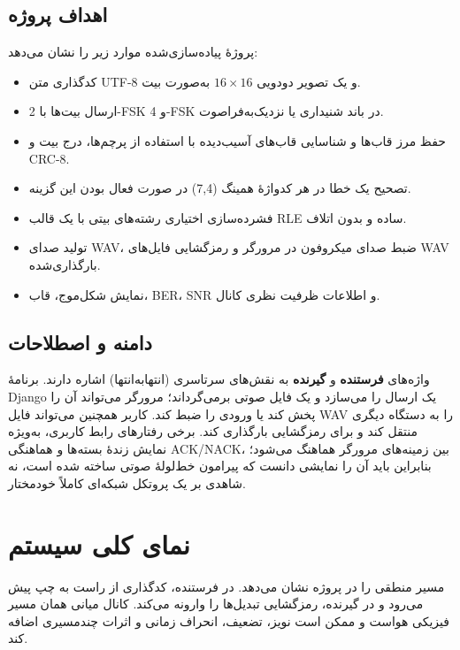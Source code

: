 \documentclass[12pt,a4paper]{article}
\providecommand{\lr}[1]{\foreignlanguage{english}{\begingroup\hyphenchar\font=-1 #1\endgroup}}
\begin{document}
\subsection{اهداف پروژه}
پروژۀ پیاده‌سازی‌شده موارد زیر را نشان می‌دهد:
\begin{itemize}
    \item کدگذاری متن \lr{UTF-8} و یک تصویر دودویی $16\times16$ به‌صورت بیت.
    \item ارسال بیت‌ها با \lr{2-FSK} و \lr{4-FSK} در باند شنیداری یا نزدیک‌به‌فراصوت.
    \item حفظ مرز قاب‌ها و شناسایی قاب‌های آسیب‌دیده با استفاده از پرچم‌ها، درج بیت و \lr{CRC-8}.
    \item تصحیح یک خطا در هر کدواژۀ همینگ \lr{(7,4)} در صورت فعال بودن این گزینه.
    \item فشرده‌سازی اختیاری رشته‌های بیتی با یک قالب \lr{RLE} ساده و بدون اتلاف.
    \item تولید صدای \lr{WAV}، ضبط صدای میکروفون در مرورگر و رمزگشایی فایل‌های \lr{WAV} بارگذاری‌شده.
    \item نمایش شکل‌موج، قاب، \lr{BER}، \lr{SNR} و اطلاعات ظرفیت نظری کانال.
\end{itemize}

\subsection{دامنه و اصطلاحات}
واژه‌های \textbf{فرستنده} و \textbf{گیرنده} به نقش‌های سرتاسری (انتها‌به‌انتها) اشاره دارند. برنامۀ \lr{Django} یک ارسال را می‌سازد و یک فایل صوتی برمی‌گرداند؛ مرورگر می‌تواند آن را پخش کند یا ورودی را ضبط کند. کاربر همچنین می‌تواند فایل \lr{WAV} را به دستگاه دیگری منتقل کند و برای رمزگشایی بارگذاری کند. برخی رفتارهای رابط کاربری، به‌ویژه نمایش زندۀ بسته‌ها و هماهنگی \lr{ACK/NACK}، بین زمینه‌های مرورگر هماهنگ می‌شود؛ بنابراین باید آن را نمایشی دانست که پیرامون خط‌لولۀ صوتی ساخته شده است، نه شاهدی بر یک پروتکل شبکه‌ای کاملاً خودمختار.

\section{نمای کلی سیستم}
\label{sec:architecture}

 مسیر منطقی را در پروژه نشان می‌دهد. در فرستنده، کدگذاری از راست به چپ پیش می‌رود و در گیرنده، رمزگشایی تبدیل‌ها را وارونه می‌کند. کانال میانی همان مسیر فیزیکی هواست و ممکن است نویز، تضعیف، انحراف زمانی و اثرات چندمسیری اضافه کند.
\end{document}

